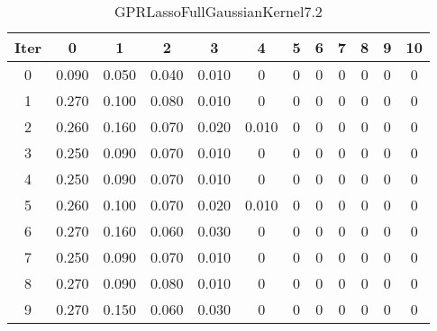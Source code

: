 \begin{table}
	\begin{center}
		\begin{tabular}{|c|c|c|c|c|c|c|c|c|c|c|c|}
			\hline
			Iter & 0 & 1 & 2 & 3 & 4 & 5 & 6 & 7 & 8 & 9 & 10 \\
			\hline
			0 & 0.090 & 0.050 & 0.040 & 0.010 & 0 & 0 & 0 & 0 & 0 & 0 & 0 \\
			\hline
			1 & 0.270 & 0.100 & 0.080 & 0.010 & 0 & 0 & 0 & 0 & 0 & 0 & 0 \\
			\hline
			2 & 0.260 & 0.160 & 0.070 & 0.020 & 0.010 & 0 & 0 & 0 & 0 & 0 & 0 \\
			\hline
			3 & 0.250 & 0.090 & 0.070 & 0.010 & 0 & 0 & 0 & 0 & 0 & 0 & 0 \\
			\hline
			4 & 0.250 & 0.090 & 0.070 & 0.010 & 0 & 0 & 0 & 0 & 0 & 0 & 0 \\
			\hline
			5 & 0.260 & 0.100 & 0.070 & 0.020 & 0.010 & 0 & 0 & 0 & 0 & 0 & 0 \\
			\hline
			6 & 0.270 & 0.160 & 0.060 & 0.030 & 0 & 0 & 0 & 0 & 0 & 0 & 0 \\
			\hline
			7 & 0.250 & 0.090 & 0.070 & 0.010 & 0 & 0 & 0 & 0 & 0 & 0 & 0 \\
			\hline
			8 & 0.270 & 0.090 & 0.080 & 0.010 & 0 & 0 & 0 & 0 & 0 & 0 & 0 \\
			\hline
			9 & 0.270 & 0.150 & 0.060 & 0.030 & 0 & 0 & 0 & 0 & 0 & 0 & 0 \\
			\hline
		\end{tabular}
	\end{center}
	\caption{GPRLassoFullGaussianKernel7.2}
\end{table}